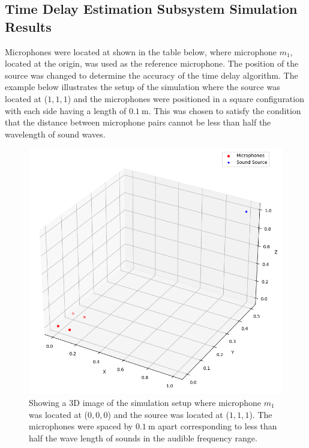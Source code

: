 \documentclass[a4paper,11pt]{article}
\begin{document}
\subsection{Time Delay Estimation Subsystem Simulation Results}
Microphones were located at shown in the table below, where microphone $m_1$, located at the origin, was used as the reference microphone. The position of the source was changed to determine the accuracy of the time delay algorithm. The example below illustrates the setup of the simulation where the \gls{source} was located at ($1,1,1$) and the microphones were positioned in a square configuration with each side having a length of $\SI{0.1}{\meter}$. This was chosen to satisfy the condition that the distance between microphone pairs cannot be less than half the wavelength of sound waves. 
\begin{figure}[ht!]
	\centering
	\includegraphics[width=0.8\linewidth]{3d_representation.png}
	\caption{Showing a 3D image of the simulation setup where microphone $m_1$ was located at ($0,0,0$) and the source was located at ($1,1,1$). The microphones were spaced by $\SI{0.1}{\meter}$ apart corresponding to less than half the wave length of sounds in the audible frequency range.}
	\label{fig:microphone_positions}
\end{figure}
\end{document}
